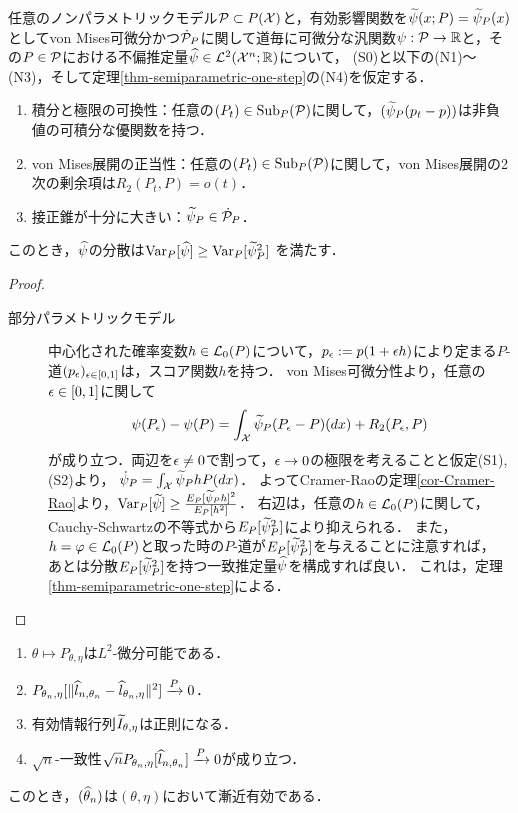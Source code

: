 \documentclass[uplatex, dvipdfmx]{jsarticle}
\newcommand{\Sub}{\mathrm{Sub}}
\begin{document}
\begin{theorem}[ノンパラメトリック一致推定量の最小分散]
    任意のノンパラメトリックモデル$\P\subset P(\X)$と，有効影響関数を$\wt{\psi}(x;P)=\wt{\psi}_P(x)$としてvon Mises可微分かつ$\dot{\P}_P$に関して道毎に可微分な汎関数$\psi:\P\to\R$と，その$P\in\P$における不偏推定量$\wh{\psi}\in\L^2(\X^n;\R)$について，
    (S0)と以下の(N1)〜(N3)，そして定理\ref{thm-semiparametric-one-step}の(N4)を仮定する．
    \begin{enumerate}[({N}1)]
        \item 積分と極限の可換性：任意の$(P_t)\in\Sub_P(\P)$に関して，$(\wt{\psi}_P(p_t-p))$は非負値の可積分な優関数を持つ．
        \item von Mises展開の正当性：任意の$(P_t)\in\Sub_P(\P)$に関して，von Mises展開の2次の剰余項は$R_2(P_t,P)=o(t)$．
        \item 接正錐が十分に大きい：$\wt{\psi}_P\in\dot{\P}_P$．
    \end{enumerate}
    このとき，$\wh{\psi}$の分散は$\Var_P[\wh{\psi}]\ge\Var_P[\wt{\psi}_P^2]$
    を満たす．
\end{theorem}
\begin{proof}\mbox{}
    \begin{description}
        \item[部分パラメトリックモデル] 中心化された確率変数$h\in\L_0(P)$について，$p_\ep:=p(1+\ep h)$により定まる$P$-道$(p_\ep)_{\ep\in[0,1]}$は，スコア関数$h$を持つ．
        von Mises可微分性より，任意の$\ep\in[0,1]$に関して
        \[\psi(P_\ep)-\psi(P)=\int_\X\wt{\psi}_P(P_\ep-P)(dx)+R_2(P_\ep,P)\]
        が成り立つ．両辺を$\ep\ne0$で割って，$\ep\to0$の極限を考えることと仮定(S1),(S2)より，
        $\dot{\psi}_P=\int_\X\wt{\psi}_P hP(dx)$．
        よってCramer-Raoの定理\ref{cor-Cramer-Rao}より，$\Var_P[\wt{\psi}]\ge\frac{E_P[\wt{\psi}_Ph]^2}{E_P[h^2]}$．
        右辺は，任意の$h\in\L_0(P)$に関して，Cauchy-Schwartzの不等式から$E_P[\wt{\psi}_P^2]$により抑えられる．
        また，$h=\varphi\in\L_0(P)$と取った時の$P$-道が$E_P[\wt{\psi}_P^2]$を与えることに注意すれば，
        あとは分散$E_P[\wt{\psi}_P^2]$を持つ一致推定量$\wh{\psi}$を構成すれば良い．
        これは，定理\ref{thm-semiparametric-one-step}による．
    \end{description}
\end{proof}

\begin{theorem}\mbox{}
    \begin{enumerate}[({S}1)]
        \item $\theta\mapsto P_{\theta,\eta}$は$L^2$-微分可能である．
        \item $P_{\theta_n,\eta}[\norm{\wh{l}_{n,\theta_n}-\wh{l}_{\theta_n,\eta}}^2]\xrightarrow{P}0$．
        \item 有効情報行列$\wt{I}_{\theta,\eta}$は正則になる．
        \item $\sqrt{n}$-一致性$\sqrt{n}P_{\theta_n,\eta}[\wh{l}_{n,\theta_n}]\xrightarrow{P}0$が成り立つ．
    \end{enumerate}
    このとき，$(\wh{\theta}_n)$は$(\theta,\eta)$において漸近有効である．
\end{theorem}
\end{document}
